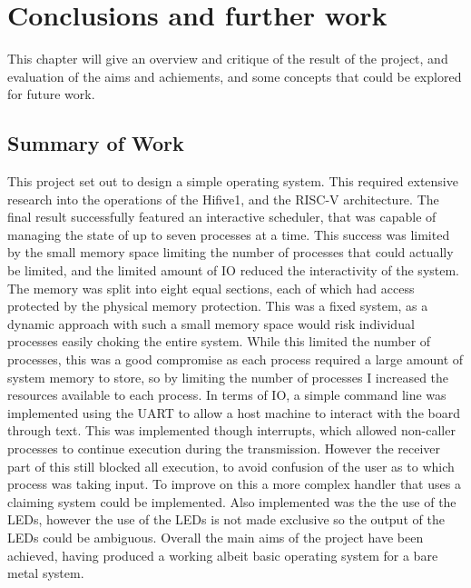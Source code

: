 \chapter[Conclusions and further work]{Conclusions and further work}
\label{cha:conc}
This chapter will give an overview and critique of the result of the project, and evaluation of the aims and achiements, and some concepts that could be explored for future work.  
\section{Summary of Work}
This project set out to design a simple operating system. This required extensive research into the operations of the Hifive1, and the RISC-V architecture. The final result successfully featured an interactive scheduler, that was capable of managing the state of up to seven processes at a time. This success was limited by the small memory space limiting the number of processes that could actually be limited, and the limited amount of IO reduced the interactivity of the system. The memory was split into eight equal sections, each of which had access protected by the physical memory protection. This was a fixed system, as a dynamic approach with such a small memory space would risk individual processes easily choking the entire system. While this limited the number of processes, this was a good compromise as each process required a large amount of system memory to store, so by limiting the number of processes I increased the resources available to each process. In terms of IO, a simple command line was implemented using the UART to allow a host machine to interact with the board through text. This was implemented though interrupts, which allowed non-caller processes to continue execution during the transmission. However the receiver part of this still blocked all execution, to avoid confusion of the user as to which process was taking input. To improve on this a more complex handler that uses a claiming system could be implemented. Also implemented was the the use of the LEDs, however the use of the LEDs is not made exclusive so the output of the LEDs could be ambiguous. Overall the main aims of the project have been achieved, having produced a working albeit basic operating system for a bare metal system. 

